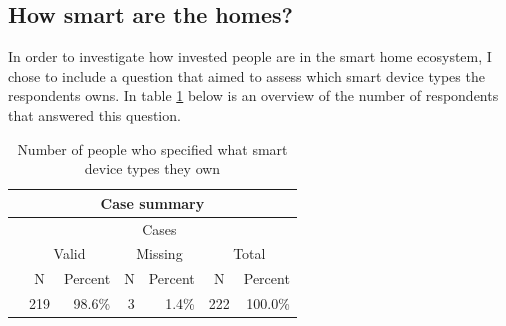 \subsection{How smart are the homes?}
In order to investigate how invested people are in the smart home ecosystem, I chose to include a question that aimed to assess which smart device types the respondents owns. In table \ref{tab:how_smart_N} below is an overview of the number of respondents that answered this question. 

\begin{table}[H]
\centering
\begin{tabular}{|l|c|c|c|c|c|c|}
\hline
\multicolumn{7}{|c|}{{\color[HTML]{010205} \textbf{Case summary}}}                                                                                                                                                                                                                                                                                                              \\ \hline
{\color[HTML]{264A60} }                                      & \multicolumn{6}{c|}{{\color[HTML]{264A60} Cases}}                                                                                                                                                                                                                                                                \\ \cline{2-7} 
{\color[HTML]{264A60} }                                      & \multicolumn{2}{c|}{{\color[HTML]{264A60} Valid}}                                                    & \multicolumn{2}{c|}{{\color[HTML]{264A60} Missing}}                                               & \multicolumn{2}{c|}{{\color[HTML]{264A60} Total}}                                                     \\ \cline{2-7} 
\multirow{-3}{*}{{\color[HTML]{264A60} }}                    & {\color[HTML]{264A60} N}                        & {\color[HTML]{264A60} Percent}                     & {\color[HTML]{264A60} N}                      & {\color[HTML]{264A60} Percent}                    & {\color[HTML]{264A60} N}                        & {\color[HTML]{264A60} Percent}                      \\ \hline
\cellcolor[HTML]{E0E0E0}{\color[HTML]{000000} Smart devices} & \multicolumn{1}{r|}{{\color[HTML]{010205} 219}} & \multicolumn{1}{r|}{{\color[HTML]{010205} 98.6\%}} & \multicolumn{1}{r|}{{\color[HTML]{010205} 3}} & \multicolumn{1}{r|}{{\color[HTML]{010205} 1.4\%}} & \multicolumn{1}{r|}{{\color[HTML]{010205} 222}} & \multicolumn{1}{r|}{{\color[HTML]{010205} 100.0\%}} \\ \hline
\end{tabular}
\caption{Number of people who specified what smart device types they own}
\label{tab:how_smart_N}
\end{table}


